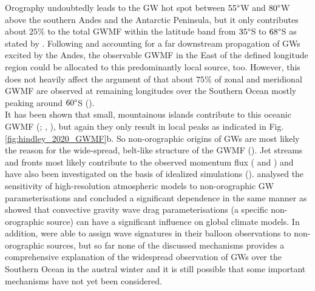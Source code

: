Orography undoubtedly leads to the GW hot spot between $55 \degree$W and $80 \degree$W above the southern Andes and the Antarctic Peninsula, but it only contributes about $25 \%$ to the total GWMF within the latitude band from $35 \degree$S to $68 \degree$S as stated by \textcite{hindley_18year_2020}. Following \textcite{sato_gravity_2012} and accounting for a far downstream propagation of GWs excited by the Andes, the observable GWMF in the East of the defined longitude region could be allocated to this predominantly local source, too. However, this does not heavily affect the argument of \textcite{hindley_18year_2020} that about $75 \%$ of zonal and meridional GWMF are observed at remaining longitudes over the Southern Ocean mostly peaking around $60 \degree$S (\cite{hindley_18year_2020}). \\
It has been shown that small, mountainous islands contribute to this oceanic GWMF (\cite{garfinkel_effect_2018}; \cite{mclandress_is_2012}, \cite{alexander_momentum_2009}), but again they only result in local peaks as indicated in Fig. \ref{fig:hindley_2020_GWMF}b. So non-orographic origins of GWs are most likely the reason for the wide-spread, belt-like structure of the GWMF (\cite{hendricks_what_2014}). Jet streams and fronts most likely contribute to the observed momentum flux (\cite{plougonven_internal_2014} and \cite{hendricks_what_2014}) and have also been investigated on the basis of idealized simulations (\cite{osullivan_generation_1995}). \textcite{polichtchouk_sensitivity_2018} analysed the sensitivity of high-resolution atmospheric models to non-orographic GW parameterisations and concluded a significant dependence in the same manner as \textcite{choi_effects_2013} showed that convective gravity wave drag parameterisations (a specific non-orographic source) can have a significant influence on global climate models. In addition, \textcite{jewtoukoff_comparison_2015} were able to assign wave signatures in their balloon observations to non-orographic sources, but so far none of the discussed mechanisms provides a comprehensive explanation of the widespread observation of GWs over the Southern Ocean in the austral winter and it is still possible that some important mechanisms have not yet been considered.

